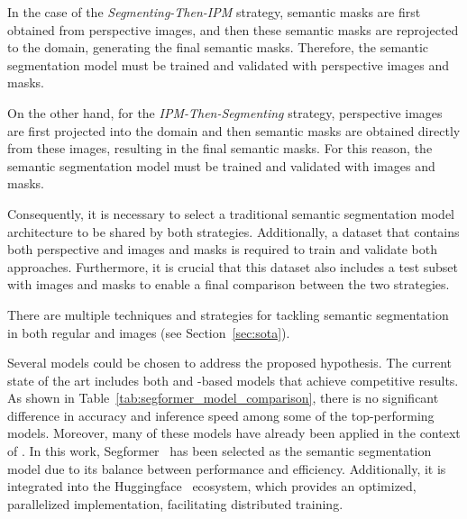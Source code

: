 In the case of the \textit{Segmenting-Then-IPM} strategy, semantic masks are first obtained from perspective images, and then these semantic masks are reprojected to the  domain, generating the final  semantic masks. Therefore, the semantic segmentation model must be trained and validated with perspective images and masks.

On the other hand, for the \textit{IPM-Then-Segmenting} strategy, perspective images are first projected into the  domain and then semantic masks are obtained directly from these  images, resulting in the final  semantic masks. For this reason, the semantic segmentation model must be trained and validated with  images and masks.

Consequently, it is necessary to select a traditional semantic segmentation model architecture to be shared by both strategies. Additionally, a dataset that contains both perspective and  images and masks is required to train and validate both approaches. Furthermore, it is crucial that this dataset also includes a test subset with  images and masks to enable a final comparison between the two strategies.

There are multiple techniques and strategies for tackling semantic segmentation in both regular and  images (see Section~\ref{sec:sota}).  

Several models could be chosen to address the proposed hypothesis. The current state of the art includes both  and -based models that achieve competitive results. As shown in Table~\ref{tab:segformer_model_comparison}, there is no significant difference in accuracy and inference speed among some of the top-performing models. Moreover, many of these models have already been applied in the context of . In this work, Segformer~\cite{segformer} has been selected as the semantic segmentation model due to its balance between performance and efficiency. Additionally, it is integrated into the Huggingface~\cite{huggingface} ecosystem, which provides an optimized, parallelized implementation, facilitating distributed training.  

